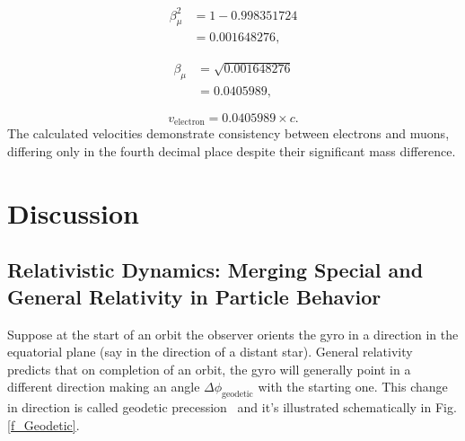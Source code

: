 \documentclass[%
 reprint,
 amsmath,amssymb,
 aps,
]{revtex4-1}
\numberwithin{equation}{section}%
\begin{document}
\begin{equation}
   \begin{split}
       \beta^2_{\mu} &= 1 - 0.998351724 \\
       &= 0.001648276,
   \label{eq:beta_muon_squared}
   \end{split}
\end{equation}

\begin{equation}
   \begin{split}
       \beta_{\mu} &= \sqrt{0.001648276} \\
       &= 0.0405989, 
   \label{eq:beta_muon_final}
   \end{split}
\end{equation}

\begin{equation}
   v_{\text{electron}} = 0.0405989 \times c.
   \label{eq:velocity_muon}
\end{equation}
The calculated velocities demonstrate consistency between electrons and muons, differing only in the fourth decimal place despite their significant mass difference.


\section{Discussion}
\label{sec:Discussion}


\subsection{Relativistic Dynamics: Merging Special and General Relativity in Particle Behavior}
\label{sec:RelativisticDynamicsMerging}

Suppose at the start of an orbit the observer orients the gyro in a direction in the equatorial plane (say in the direction of a distant star). General relativity predicts that on completion of an orbit, the gyro will generally point in a different direction making an angle $\Delta \phi_{\mathrm{geodetic}}$ with the starting one. This change in direction is called geodetic precession~\cite{Everitt2011} and it's illustrated schematically in Fig. \ref{f_Geodetic}. 
\end{document}
